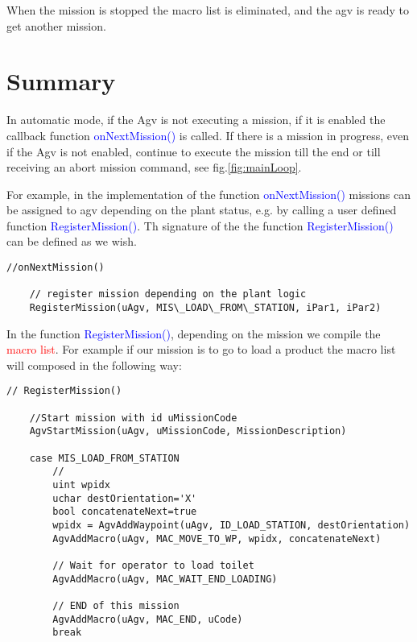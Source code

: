 When the mission is stopped the macro list is eliminated, and the agv is ready to get another mission. 



\section{Summary}
In automatic mode, if the Agv is not executing a mission, if it is enabled the callback function \textcolor{blue}{onNextMission()} is called. If there is a mission in progress, even if the Agv is not enabled, continue to execute the mission till the end or till receiving an abort mission command, see fig.\ref{fig:mainLoop}.

For example, in the implementation of the function \textcolor{blue}{onNextMission()} missions can be assigned to agv depending on the plant status, e.g. by calling a user defined function \textcolor{blue}{RegisterMission()}. Th signature of the the function \textcolor{blue}{RegisterMission()} can be defined as we wish.

\begin{lstlisting}[caption=onNextMission() missions are assigned]
	//onNextMission()
	
	// register mission depending on the plant logic
	RegisterMission(uAgv, MIS\_LOAD\_FROM\_STATION, iPar1, iPar2)
\end{lstlisting}

In the function \textcolor{blue}{RegisterMission()}, depending on the mission we compile the \textcolor{red}{macro list}. For example if our mission is to go to load a product the macro list will composed in the following way:
\begin{lstlisting}[caption=RegisterMission() macro list is composed]
	// RegisterMission()
	
	//Start mission with id uMissionCode
	AgvStartMission(uAgv, uMissionCode, MissionDescription)

	case MIS_LOAD_FROM_STATION
		//
		uint wpidx
		uchar destOrientation='X'
		bool concatenateNext=true
		wpidx = AgvAddWaypoint(uAgv, ID_LOAD_STATION, destOrientation)
		AgvAddMacro(uAgv, MAC_MOVE_TO_WP, wpidx, concatenateNext)
		
		// Wait for operator to load toilet
		AgvAddMacro(uAgv, MAC_WAIT_END_LOADING)
		
		// END of this mission
		AgvAddMacro(uAgv, MAC_END, uCode)
		break
\end{lstlisting}

